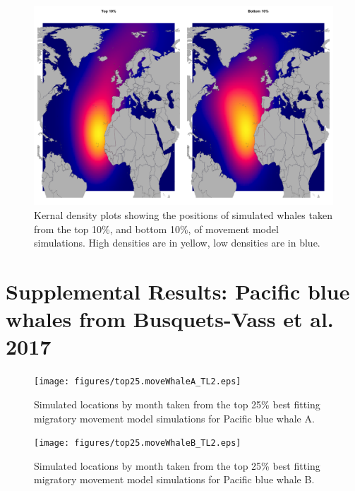 \documentclass[a4paper,10pt]{article}
\begin{document}
\begin{landscape}
    \begin{figure}[!htbp]
    \centering
      \includegraphics[width=\linewidth]{figures/Figure-S8-kernals.png}
      \caption{Kernal density plots showing the positions of simulated whales taken from the top 10\%, and bottom 10\%, of movement model simulations. 
      High densities are in yellow, low densities are in blue.}
      \label{figs8}
  \end{figure}
\end{landscape}

\newpage

\section*{Supplemental Results: Pacific blue whales from Busquets-Vass et al. 2017}

\begin{landscape}
    \begin{figure}[!htbp]
    \centering
      \texttt{[image: figures/top25.moveWhaleA\_TL2.eps]}
      \caption{Simulated locations by month taken from the top 25\% best fitting migratory movement model simulations for Pacific blue whale A.}
      \label{figwhaleA}
  \end{figure}
\end{landscape}

\begin{landscape}
    \begin{figure}[!htbp]
    \centering
      \texttt{[image: figures/top25.moveWhaleB\_TL2.eps]}
      \caption{Simulated locations by month taken from the top 25\% best fitting migratory movement model simulations for Pacific blue whale B.}
      \label{figwhaleB}
  \end{figure}
\end{landscape}
\end{document}

